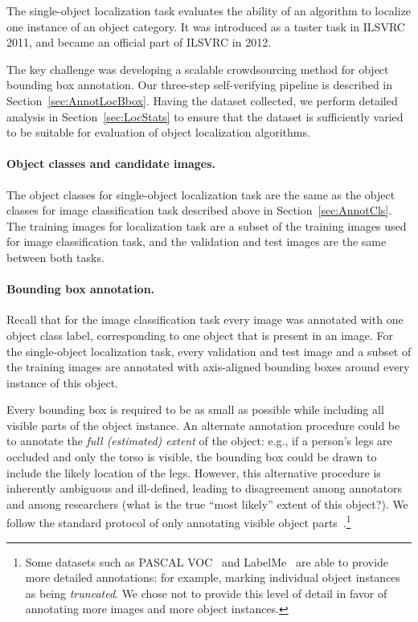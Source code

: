 \begin{table}
The single-object localization task evaluates the ability of an algorithm to localize one instance of an object category.
It was introduced as a  taster task in ILSVRC 2011, and became an official part of ILSVRC in 2012.

The key challenge
was developing a scalable crowdsourcing method for object bounding box annotation. Our three-step self-verifying
pipeline is described in Section~\ref{sec:AnnotLocBbox}. Having the dataset collected, we perform detailed analysis in Section~\ref{sec:LocStats}
to ensure that the dataset is sufficiently varied to be suitable for evaluation of object localization algorithms.

\paragraph{Object classes and candidate images.}
The object classes for single-object localization task are the same as the object classes for image classification task described above in Section~\ref{sec:AnnotCls}. The training
images for localization task are a subset of the training images used for image classification task, and the validation and test
images are the same between both tasks. 




\paragraph{Bounding box annotation.} Recall that for the image classification task every image was annotated with one object class label, corresponding to
one object that is present in an image. For the single-object localization task, every validation and test image and a subset of the training images
are annotated with axis-aligned bounding boxes around every instance of this object.

Every bounding box is required to be as small as possible while including all visible parts of the object instance. An alternate annotation procedure could be to annotate the \emph{full (estimated) extent} of the object: e.g., if a person's legs are occluded and only the torso is visible, the bounding box could be drawn to include the likely location of the legs. However, this alternative procedure is inherently ambiguous and ill-defined, leading to disagreement among annotators and among researchers (what is the true ``most likely'' extent of this object?). We follow the standard protocol of only annotating visible object parts~\citep{LabelMe,PASCALIJCV}.\footnote{Some datasets such as PASCAL VOC~\citep{PASCALIJCV} and LabelMe~\citep{LabelMe} are able to provide more detailed annotations: for example, marking individual object instances as being \emph{truncated}. We chose not to provide this level of detail in favor of annotating more images and more object instances.}


\end{table}
